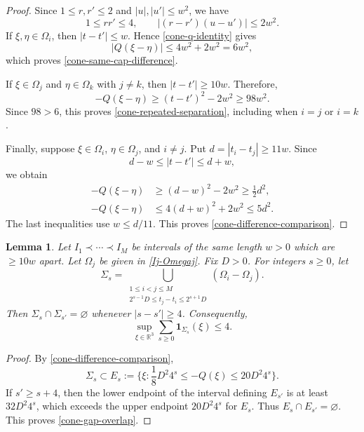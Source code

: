 \documentclass{amsart}
\numberwithin{equation}{section}
\newtheorem{lemma}[theorem]{Lemma}
\newcommand{\ZR}{\mathbb{R}}
\begin{document}
\begin{proof}
Since $1\leq r,r'\leq2$ and $|u|,|u'|\leq w^2$, we have
\[
    1\leq rr'\leq4,\qquad |(r-r')(u-u')|\leq2w^2.
\]
If $\xi,\eta\in\Omega_i$, then $|t-t'|\leq w$.
Hence \eqref{cone-q-identity} gives
\[
    |Q(\xi-\eta)|\leq4w^2+2w^2=6w^2,
\]
which proves \eqref{cone-same-cap-difference}.

If $\xi\in\Omega_j$ and $\eta\in\Omega_k$ with $j\ne k$, then $|t-t'|\geq10w$. 
Therefore,
\[
    -Q(\xi-\eta)\geq(t-t')^2-2w^2\geq98w^2.
\]
Since $98>6$, this proves \eqref{cone-repeated-separation}, including
when $i=j$ or $i=k$.

Finally, suppose $\xi\in\Omega_i$, $\eta\in\Omega_j$, and $i\ne j$.
Put $d=|t_i-t_j|\geq11w$. Since
\[
    d-w\leq|t-t'|\leq d+w,
\]
we obtain
\begin{align*}
    -Q(\xi-\eta)&\geq(d-w)^2-2w^2\geq\frac12d^2,\\
    -Q(\xi-\eta)&\leq4(d+w)^2+2w^2\leq5d^2.
\end{align*}
The last inequalities use $w\leq d/11$.
This proves \eqref{cone-difference-comparison}.
\end{proof} 

\begin{samepage}
\begin{lemma}
\label{cone-scale-geometry}
Let $I_1\prec\cdots\prec I_M$ be intervals of the same length $w>0$ which are $\geq10w$ apart.
Let $\Omega_j$ be given in \eqref{Ij-Omegaj}.
Fix $D>0$. 
For integers $s\geq0$, let
\begin{equation}
\label{cone-gap-regions}
    \Sigma_s=
    \bigcup_{\substack{1\leq i<j\leq M\\
        2^{s-1}D\leq t_j-t_i\leq2^{s+1}D}}
    (\Omega_i-\Omega_j).
\end{equation}
Then $\Sigma_s\cap\Sigma_{s'}=\varnothing$ whenever $|s-s'|\geq4$.
Consequently,
\begin{equation}
\label{cone-gap-overlap}
    \sup_{\xi\in\ZR^3}\sum_{s\geq0}\mathbf{1}_{\Sigma_s}(\xi)
    \leq4.
\end{equation}
\end{lemma}
\end{samepage}

\begin{proof}
By \eqref{cone-difference-comparison},
\begin{equation}
\nonumber
    \Sigma_s\subset E_s
    :=\Big\{\xi:\frac18D^2 4^s
    \leq -Q(\xi)\leq20D^2 4^s\Big\}.
\end{equation}
If $s'\geq s+4$, then the lower endpoint of the interval defining $E_{s'}$ is at least $32D^2 4^s$, which exceeds the upper endpoint $20D^2 4^s$ for $E_s$. 
Thus $E_s\cap E_{s'}=\varnothing$. 
This proves \eqref{cone-gap-overlap}.
\end{proof}
\end{document}
